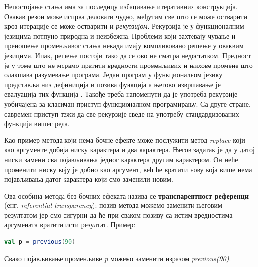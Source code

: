 \documentclass[12pt,oneside]{memoir}
\begin{document}
\par Непостојање стања има за последицу избацивање итеративних конструкција. Овакав резон може испрва деловати чудно, међутим све што се може остварити кроз итерације се може остварити и \textit{рекурзијом}. Рекурзија је у функционалним језицима потпуно природна и неизбежна. Проблеми који захтевају чување и преношење променљивог стања некада имају компликовано решење у оваквим језицима. Ипак, решење постоји тако да се ово не сматра недостатком. Предност је у томе што не морамо пратити вредности променљивих и њихове промене што олакшава разумевање програма. Један програм у функционалном језику представља низ дефиниција и позива функција а његово извршавање је евалуација тих функција \cite{funkMilena}. Такође треба напоменути да је употреба рекурзије уобичајена за класичан приступ функционалном програмирању. Са друге стране, савремен приступ тежи да све рекурзије сведе на употребу стандардизованих функција вишег реда.
\par Као пример метода који нема бочне ефекте може послужити метод \textit{replace} који као аргументе добија ниску карактера и два карактера. Његов задатак је да у датој ниски замени сва појављивања једног карактера другим карактером. Он неће променити ниску коју је добио као аргумент, већ ће вратити нову која више нема појављивања датог карактера који смо заменили новим.  
\par Ова особина метода без бочних ефеката назива се \textbf{транспарентност референци} (енг. \textit{referential transparency}): позив метода можемо заменити његовим резултатом јер смо сигурни да ће при сваком позиву са истим вредностима аргумената вратити исти резултат. Пример:

\begin{lstlisting}[language=Scala]
val p = previous(90)
\end{lstlisting}
Свако појављивање променљиве \textit{p} можемо заменити изразом \textit{previous(90)}.
\end{document}
